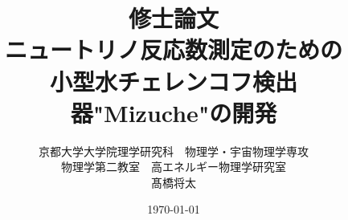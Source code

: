 \documentclass[11pt,draft]{ltjsreport}
\begin{document}
\begin{titlepage}

\title{修士論文\\ニュートリノ反応数測定のための\\小型水チェレンコフ検出器"Mizuche"の開発}
\author{京都大学大学院理学研究科　物理学・宇宙物理学専攻\\
物理学第二教室　高エネルギー物理学研究室\\
髙橋将太
}
\date{\today}


\end{titlepage}

\maketitle



\tableofcontents
















%
%
\end{document}
